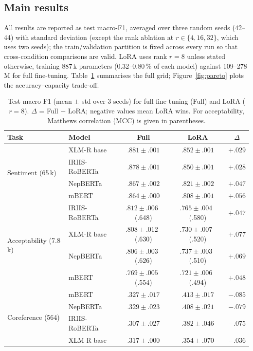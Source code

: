 \subsection{Main results}

All results are reported as test macro-F1, averaged over three random seeds
(42--44) with standard deviation (except the rank ablation at
$r \in \{4, 16, 32\}$, which uses two seeds); the train/validation partition is fixed
across every run so that cross-condition comparisons are valid.
LoRA uses rank
$r{=}8$ unless stated otherwise, training 887\,k parameters
(0.32--0.80\,\% of each model) against 109--278\,M for full fine-tuning.
Table~\ref{tab:main} summarises the full grid; Figure~\ref{fig:pareto} plots
the accuracy--capacity trade-off.

\begin{table}[t]
  \centering
  \caption{Test macro-F1 (mean $\pm$ std over 3 seeds) for full fine-tuning
  (Full) and LoRA ($r{=}8$). $\Delta$ = Full $-$ LoRA; negative values mean
  LoRA wins. For acceptability, Matthews correlation (MCC) is given in
  parentheses.}
  \label{tab:main}
  \begin{tabular}{llccc}
    \toprule
    Task & Model & Full & LoRA & $\Delta$ \\
    \midrule
    \multirow{4}{*}{Sentiment (65\,k)}
      & XLM-R base      & $.881 \pm .001$ & $.852 \pm .001$ & $+.029$ \\
      & IRIIS-RoBERTa   & $.878 \pm .001$ & $.850 \pm .001$ & $+.028$ \\
      & NepBERTa        & $.867 \pm .002$ & $.821 \pm .002$ & $+.047$ \\
      & mBERT           & $.864 \pm .000$ & $.808 \pm .001$ & $+.056$ \\
    \midrule
    \multirow{4}{*}{Acceptability (7.8\,k)}
      & IRIIS-RoBERTa   & $.812 \pm .006$ \,(.648) & $.765 \pm .004$ \,(.580) & $+.047$ \\
      & XLM-R base      & $.808 \pm .012$ \,(.630) & $.730 \pm .007$ \,(.520) & $+.077$ \\
      & NepBERTa        & $.806 \pm .003$ \,(.626) & $.737 \pm .003$ \,(.510) & $+.069$ \\
      & mBERT           & $.769 \pm .005$ \,(.554) & $.721 \pm .006$ \,(.494) & $+.048$ \\
    \midrule
    \multirow{4}{*}{Coreference (564)}
      & mBERT           & $.327 \pm .017$ & $.413 \pm .017$ & $-.085$ \\
      & NepBERTa        & $.329 \pm .023$ & $.408 \pm .021$ & $-.079$ \\
      & IRIIS-RoBERTa   & $.307 \pm .027$ & $.382 \pm .046$ & $-.075$ \\
      & XLM-R base      & $.317 \pm .000$ & $.354 \pm .070$ & $-.036$ \\
    \bottomrule
  \end{tabular}
\end{table}

